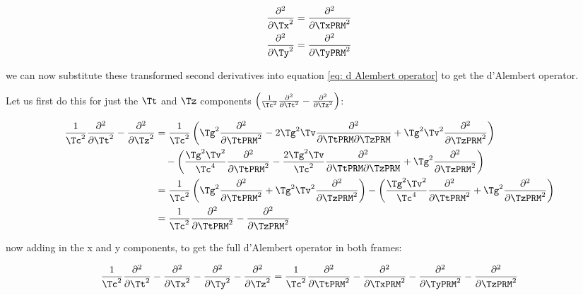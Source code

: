 \begin{derivation}
	\begin{equation}
		\begin{aligned}
			\frac{\partial^2}{\partial \Tx ^2} & = \frac{\partial^2}{\partial \TxPRM ^2} \\
			\frac{\partial^2}{\partial \Ty ^2} & = \frac{\partial^2}{\partial \TyPRM ^2}
		\end{aligned}
	\end{equation}

	we can now substitute these transformed second derivatives into equation \eqref{eq: d Alembert operator} to get the d'Alembert operator.

	Let us first do this for just the $\Tt $ and $\Tz $ components $\left(\frac{1}{\Tc ^2}\frac{\partial^2}{\partial \Tt ^2} - \frac{\partial^2}{\partial \Tz ^2}\right)$:

	\begin{equation}
		\begin{aligned}
			\frac{1}{\Tc ^2}\frac{\partial^2}{\partial \Tt ^2} - \frac{\partial^2}{\partial \Tz ^2}
			 & = \frac{1}{\Tc ^2}\left(\Tg ^2 \frac{\partial^2}{\partial \TtPRM ^2} - 2\Tg ^2 \Tv  \frac{\partial^2}{\partial \TtPRM \partial \TzPRM } + \Tg ^2 \Tv ^2 \frac{\partial^2}{\partial \TzPRM ^2}\right)                                                              \\
			 & \quad - \left(\frac{\Tg ^2 \Tv ^2}{\Tc ^4} \frac{\partial^2}{\partial \TtPRM ^2} - \frac{2\Tg ^2 \Tv }{\Tc ^2} \frac{\partial^2}{\partial \TtPRM \partial \TzPRM } + \Tg ^2 \frac{\partial^2}{\partial \TzPRM ^2}\right)                                             \\
			 & = \frac{1}{\Tc ^2}\left(\Tg ^2 \frac{\partial^2}{\partial \TtPRM ^2} + \Tg ^2 \Tv ^2 \frac{\partial^2}{\partial \TzPRM ^2}\right) - \left(\frac{\Tg ^2 \Tv ^2}{\Tc ^4} \frac{\partial^2}{\partial \TtPRM ^2} + \Tg ^2 \frac{\partial^2}{\partial \TzPRM ^2}\right) \\
			 & = \frac{1}{\Tc ^2} \frac{\partial^2}{\partial \TtPRM ^2} - \frac{\partial^2}{\partial \TzPRM ^2}
		\end{aligned}
	\end{equation}

	now adding in the x and y components, to get the full d'Alembert operator in both frames:

	\begin{equation}
		\frac{1}{\Tc ^2}\frac{\partial^2}{\partial \Tt ^2} - \frac{\partial^2}{\partial \Tx ^2} - \frac{\partial^2}{\partial \Ty ^2} - \frac{\partial^2}{\partial \Tz ^2} = \frac{1}{\Tc ^2}\frac{\partial^2}{\partial \TtPRM ^2} - \frac{\partial^2}{\partial \TxPRM ^2} - \frac{\partial^2}{\partial \TyPRM ^2} - \frac{\partial^2}{\partial \TzPRM ^2}
	\end{equation}


\end{derivation}
